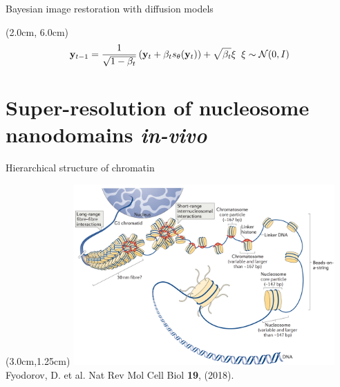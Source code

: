 \documentclass{beamer}					%
\begin{document}
\begin{frame}{Bayesian image restoration with diffusion models}
\begin{textblock*}{2cm}(2.0cm, 6.0cm)
\begin{equation*}
\bold{y}_{t-1} = \frac{1}{\sqrt{1-\beta_{t}}}\left(\bold{y}_{t} + \beta_{t}s_{\theta}(\bold{y}_{t})\right) + \sqrt{\beta_{t}}\xi \;\; \xi \sim \mathcal{N}(0,I)
\end{equation*}
\end{textblock*}


\end{frame}


\section{Super-resolution of nucleosome nanodomains \textit{in-vivo}}

\begin{frame}{Hierarchical structure of chromatin}

\begin{textblock*}{10cm}(3.0cm,1.25cm)
\includegraphics[width=10cm]{media/Chromatin}
\\
\vspace{0.4cm}
Fyodorov, D. et al. Nat Rev Mol Cell Biol \textbf{19}, (2018).
\end{textblock*}

\end{frame}
\end{document}
